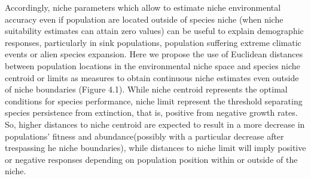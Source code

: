 \documentclass[11pt,twoside]{reedthesis}
\begin{document}
Accordingly, niche parameters which allow to estimate niche
environmental accuracy even if population are located outside of species
niche (when niche suitability estimates can attain zero values) can be
useful to explain demographic responses, particularly in sink
populations, population suffering extreme climatic events or alien
species expansion. Here we propose the use of Euclidean distances
between population locations in the environmental niche space and
species niche centroid or limits as measures to obtain continuous niche
estimates even outside of niche boundaries (Figure 4.1). While niche
centroid represents the optimal conditions for species performance,
niche limit represent the threshold separating species persistence from
extinction, that is, positive from negative growth rates. So, higher
distances to niche centroid are expected to result in a more decrease in
populations' fitness and abundance(possibly with a particular decrease
after trespassing he niche boundaries), while distances to niche limit
will imply positive or negative responses depending on population
position within or outside of the niche.\par
\end{document}
